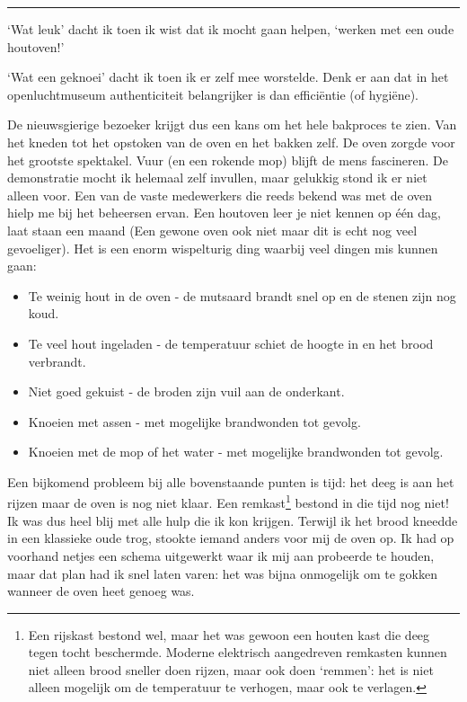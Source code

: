 \documentclass[
  11pt,
  dutch,
]{memoir}
\providecommand{\tightlist}{%
  \setlength{\itemsep}{0pt}\setlength{\parskip}{0pt}}
\begin{document}
\pfbreak

`Wat leuk' dacht ik toen ik wist dat ik mocht gaan helpen, `werken met
een oude houtoven!'

`Wat een geknoei' dacht ik toen ik er zelf mee worstelde. Denk er aan
dat in het openluchtmuseum authenticiteit belangrijker is dan
efficiëntie (of hygiëne).

De nieuwsgierige bezoeker krijgt dus een kans om het hele bakproces te
zien. Van het kneden tot het opstoken van de oven en het bakken zelf. De
oven zorgde voor het grootste spektakel. Vuur (en een rokende mop)
blijft de mens fascineren. De demonstratie mocht ik helemaal zelf
invullen, maar gelukkig stond ik er niet alleen voor. Een van de vaste
medewerkers die reeds bekend was met de oven hielp me bij het beheersen
ervan. Een houtoven leer je niet kennen op één dag, laat staan een maand
(Een gewone oven ook niet maar dit is echt nog veel gevoeliger). Het is
een enorm wispelturig ding waarbij veel dingen mis kunnen gaan:

\begin{itemize}
\tightlist
\item
  Te weinig hout in de oven - de mutsaard brandt snel op en de stenen
  zijn nog koud.
\item
  Te veel hout ingeladen - de temperatuur schiet de hoogte in en het
  brood verbrandt.
\item
  Niet goed gekuist - de broden zijn vuil aan de onderkant.
\item
  Knoeien met assen - met mogelijke brandwonden tot gevolg.
\item
  Knoeien met de mop of het water - met mogelijke brandwonden tot
  gevolg.
\end{itemize}

Een bijkomend probleem bij alle bovenstaande punten is tijd: het deeg is
aan het rijzen maar de oven is nog niet klaar. Een remkast\footnote{Een
  rijskast bestond wel, maar het was gewoon een houten kast die deeg
  tegen tocht beschermde. Moderne elektrisch aangedreven remkasten
  kunnen niet alleen brood sneller doen rijzen, maar ook doen `remmen':
  het is niet alleen mogelijk om de temperatuur te verhogen, maar ook te
  verlagen.} bestond in die tijd nog niet! Ik was dus heel blij met alle
hulp die ik kon krijgen. Terwijl ik het brood kneedde in een klassieke
oude trog, stookte iemand anders voor mij de oven op. Ik had op voorhand
netjes een schema uitgewerkt waar ik mij aan probeerde te houden, maar
dat plan had ik snel laten varen: het was bijna onmogelijk om te gokken
wanneer de oven heet genoeg was.
\end{document}
